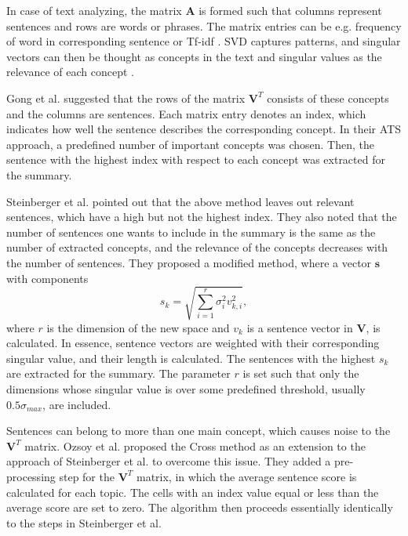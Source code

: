 \documentclass[conference]{IEEEtran}
\begin{document}
In case of text analyzing, the matrix $\mathbf{A}$ is formed such that columns represent sentences and rows are words or phrases. The matrix entries can be e.g. frequency of word in corresponding sentence or Tf-idf \cite{ozsoy2011}. SVD captures patterns, and singular vectors can then be thought as concepts in the text and singular values as the relevance of each concept \cite{gong2001}. 

Gong et al. \cite{gong2001} suggested that the rows of the matrix $\mathbf{V}^T$ consists of these concepts and the columns are sentences. Each matrix entry denotes an index, which indicates how well the sentence describes the corresponding concept. In their ATS approach, a predefined number of important concepts was chosen. Then, the sentence with the highest index with respect to each concept was extracted for the summary.

Steinberger et al. \cite{steinberger2004} pointed out that the above method leaves out relevant sentences, which have a high but not the highest index. They also noted that the number of sentences one wants to include in the summary is the same as the number of extracted concepts, and the relevance of the concepts decreases with the number of sentences. They proposed a modified method, where a vector $\mathbf{s}$ with components
\begin{equation}
s_k = \sqrt{\sum \limits_{i=1}^{r} \sigma_i^2 v_{k,i}^2},
\end{equation}
where $r$ is the dimension of the new space and $v_k$ is a sentence vector in $\mathbf{V}$, is calculated. In essence, sentence vectors are weighted with their corresponding singular value, and their length is calculated. The sentences with the highest $s_k$ are extracted for the summary. The parameter $r$ is set such that only the dimensions whose singular value is over some predefined threshold, usually $0.5 \sigma_{max}$, are included.

Sentences can belong to more than one main concept, which causes noise to the $\mathbf{V}^T$ matrix. Ozsoy et al. \cite{ozsoy2010} proposed the Cross method as an extension to the approach of Steinberger et al. to overcome this issue. They added a pre-processing step for the $\mathbf{V}^T$ matrix, in which the average sentence score is calculated for each topic. The cells with an index value equal or less than the average score are set to zero. The algorithm then proceeds essentially identically to the steps in Steinberger et al.

\end{document}

